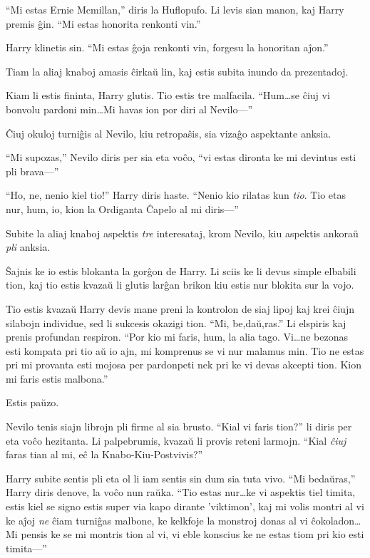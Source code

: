 ``Mi estas Ernie Mcmillan,'' diris la Huflopufo. Li levis sian manon,
kaj Harry premis ĝin. ``Mi estas honorita renkonti vin.''

Harry klinetis sin. ``Mi estas ĝoja renkonti vin, forgesu la
honoritan aĵon.''

Tiam la aliaj knaboj amasis ĉirkaŭ lin, kaj estis subita inundo da prezentadoj.

Kiam li estis fininta, Harry glutis. Tio estis tre
malfacila. ``Hum\ldots se ĉiuj vi bonvolu pardoni min\ldots Mi havas
ion por diri al Nevilo—''

Ĉiuj okuloj turniĝis al Nevilo, kiu retropaŝis, sia vizaĝo aspektante
anksia.

``Mi supozas,'' Nevilo diris per sia eta voĉo, ``vi estas dironta ke
mi devintus esti pli brava—''

``Ho, ne, nenio kiel tio!'' Harry diris haste. ``Nenio kio rilatas kun
\emph{tio}. Tio etas nur, hum, io, kion la Ordiganta Ĉapelo al mi
diris—''

Subite la aliaj knaboj aspektis \emph{tre} interesataj, krom Nevilo,
kiu aspektis ankoraŭ \emph{pli} anksia.

Ŝajnis ke io estis blokanta la gorĝon de Harry. Li sciis ke li devus simple
elbabili tion, kaj tio estis kvazaŭ li glutis larĝan brikon kiu estis nur
blokita sur la vojo.

Tio estis kvazaŭ Harry devis mane preni la kontrolon de siaj lipoj kaj krei
ĉiujn silabojn individue, sed li sukcesis okazigi tion. ``Mi, be,daŭ,ras.'' Li
elspiris kaj prenis profundan respiron. ``Por kio mi faris, hum, la alia tago.
Vi\ldots ne bezonas esti kompata pri tio aŭ io ajn, mi komprenus se vi nur
malamus min. Tio ne estas pri mi provanta esti mojosa per pardonpeti nek pri ke
vi devas akcepti tion. Kion mi faris estis malbona.''

Estis paŭzo.

Nevilo tenis siajn librojn pli firme al sia brusto. ``Kial vi faris
tion?'' li diris per eta voĉo hezitanta. Li palpebrumis, kvazaŭ li
provis reteni larmojn.  ``Kial \emph{ĉiuj} faras tian al mi, eĉ la
Knabo-Kiu-Postvivis?''

Harry subite sentis pli eta ol li iam sentis sin dum sia tuta vivo. ``Mi
bedaŭras,'' Harry diris denove, la voĉo nun raŭka. ``Tio estas nur\ldots ke vi
aspektis tiel timita, estis kiel se signo estis super via kapo dirante
'viktimon', kaj mi volis montri al vi ke aĵoj \emph{ne} ĉiam turniĝas malbone,
ke kelkfoje la monstroj donas al vi ĉokoladon\ldots Mi pensis ke se mi montris
tion al vi, vi eble konscius ke ne estas tiom pri kio esti timita—''

